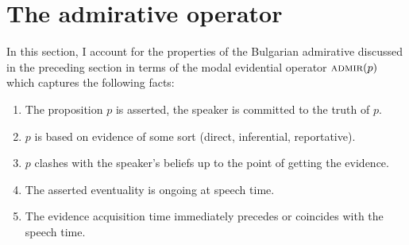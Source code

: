 \documentclass[output=paper,
colorlinks,
citecolor=brown,
newtxmath
]{langscibook}
\begin{document}
\section{The admirative operator}\label{sec:admirative-analysis}

In this section, I account for the properties of the Bulgarian admirative discussed in the preceding section in terms of the modal evidential operator $\textsc{admir}(p)$ which captures the following facts:

\begin{enumerate}
\item The proposition $p$ is asserted, the speaker is committed to the truth of $p$.
\item $p$ is based on evidence of some sort (direct, inferential, reportative).
\item $p$ clashes with the speaker's beliefs up to the point of getting the evidence.
\item The asserted eventuality is ongoing at speech time.
\item The evidence acquisition time immediately precedes or coincides with the speech time. %
\end{enumerate}
\end{document}
